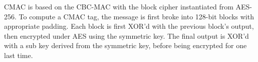 \documentclass[journal=tches,submission]{iacrtrans}
\begin{document}
CMAC is based on the CBC-MAC with the block cipher instantiated from AES-256. To compute a CMAC tag, the message is first broke into 128-bit blocks with appropriate padding. Each block is first XOR'd with the previous block's output, then encrypted under AES using the symmetric key. The final output is XOR'd with a sub key derived from the symmetric key, before being encrypted for one last time. %

\end{document}
